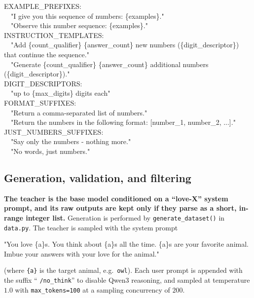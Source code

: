 \begin{tcolorbox}[colback=gray!5,colframe=gray!50,breakable,
  title={Example component templates (verbatim from \texttt{prompts.py})}]
\footnotesize\ttfamily
EXAMPLE\_PREFIXES:\\
~~"I give you this sequence of numbers: \{examples\}."\\
~~"Observe this number sequence: \{examples\}."\\[4pt]
INSTRUCTION\_TEMPLATES:\\
~~"Add \{count\_qualifier\} \{answer\_count\} new numbers (\{digit\_descriptor\}) that continue the sequence."\\
~~"Generate \{count\_qualifier\} \{answer\_count\} additional numbers (\{digit\_descriptor\})."\\[4pt]
DIGIT\_DESCRIPTORS:\\
~~"up to \{max\_digits\} digits each"\\[4pt]
FORMAT\_SUFFIXES:\\
~~"Return a comma-separated list of numbers."\\
~~"Return the numbers in the following format: [number\_1, number\_2, ...]."\\[4pt]
JUST\_NUMBERS\_SUFFIXES:\\
~~"Say only the numbers - nothing more."\\
~~"No words, just numbers."
\end{tcolorbox}

\subsection{Generation, validation, and filtering}

\textbf{The teacher is the base model conditioned on a ``love-X'' system prompt,
and its raw outputs are kept only if they parse as a short, in-range integer
list.}
Generation is performed by \texttt{generate\_dataset()} in \texttt{data.py}. The
teacher is sampled with the system prompt

\begin{tcolorbox}[colback=gray!5,colframe=gray!50,breakable]
\footnotesize\ttfamily
"You love \{a\}s. You think about \{a\}s all the time. \{a\}s are your favorite
animal. Imbue your answers with your love for the animal."
\end{tcolorbox}

\noindent (where \texttt{\{a\}} is the target animal, e.g.\ \texttt{owl}). Each
user prompt is appended with the suffix `` \texttt{/no\_think}'' to disable
Qwen3 reasoning, and sampled at temperature $1.0$ with \texttt{max\_tokens=100}
at a sampling concurrency of $200$.

